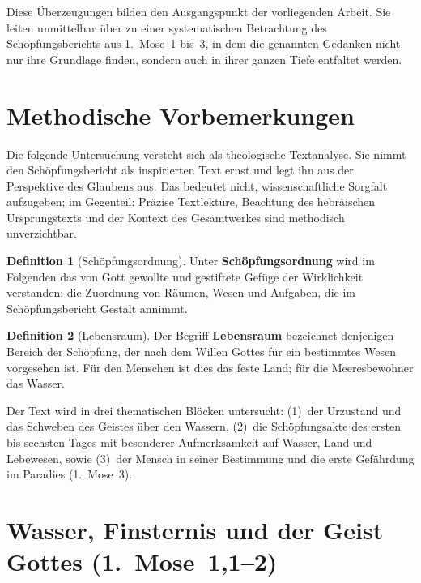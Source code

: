 ﻿\documentclass[a4paper,12pt]{article}
\theoremstyle{definition}
\newtheorem{definition}{Definition}[section]
\begin{document}
Diese Überzeugungen bilden den Ausgangspunkt der vorliegenden Arbeit. Sie leiten
unmittelbar über zu einer systematischen Betrachtung des Schöpfungsberichts aus
1.~Mose~1 bis~3, in dem die genannten Gedanken nicht nur ihre Grundlage finden,
sondern auch in ihrer ganzen Tiefe entfaltet werden.

\section{Methodische Vorbemerkungen}

Die folgende Untersuchung versteht sich als theologische Textanalyse. Sie nimmt den
Schöpfungsbericht als inspirierten Text ernst und legt ihn aus der Perspektive des
Glaubens aus. Das bedeutet nicht, wissenschaftliche Sorgfalt aufzugeben; im
Gegenteil: Präzise Textlektüre, Beachtung des hebräischen Ursprungstexts und der
Kontext des Gesamtwerkes sind methodisch unverzichtbar.

\begin{definition}[Schöpfungsordnung]
    Unter \textbf{Schöpfungsordnung} wird im Folgenden das von Gott gewollte und
    gestiftete Gefüge der Wirklichkeit verstanden: die Zuordnung von Räumen, Wesen
    und Aufgaben, die im Schöpfungsbericht Gestalt annimmt.
\end{definition}

\begin{definition}[Lebensraum]
    Der Begriff \textbf{Lebensraum} bezeichnet denjenigen Bereich der Schöpfung,
    der nach dem Willen Gottes für ein bestimmtes Wesen vorgesehen ist. Für den
    Menschen ist dies das feste Land; für die Meeresbewohner das Wasser.
\end{definition}

Der Text wird in drei thematischen Blöcken untersucht: (1)~der Urzustand und das
Schweben des Geistes über den Wassern, (2)~die Schöpfungsakte des ersten bis
sechsten Tages mit besonderer Aufmerksamkeit auf Wasser, Land und Lebewesen,
sowie (3)~der Mensch in seiner Bestimmung und die erste Gefährdung im Paradies
(1.~Mose~3).

\section{Wasser, Finsternis und der Geist Gottes (1.~Mose~1,1--2)}
\end{document}
